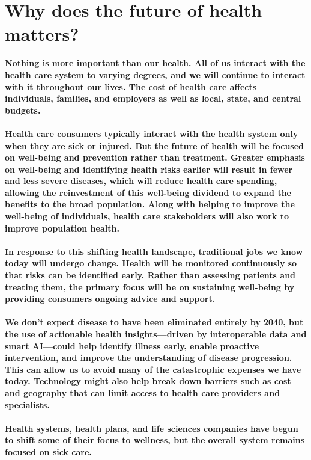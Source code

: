 \documentclass[12pt]{article}
\begin{document}
    \\\\\section{Why does the future of health matters?}
    \paragraph{Nothing is more important than our health. All of us interact with the health care system to varying degrees, and we will continue to interact with it throughout our lives. The cost of health care affects individuals, families, and employers as well as local, state, and central budgets.\\\\
   	Health care consumers typically interact with the health system only when they are sick or injured. But the future of health will be focused on well-being and prevention rather than treatment. Greater emphasis on well-being and identifying health risks earlier will result in fewer and less severe diseases, which will reduce health care spending, allowing the reinvestment of this well-being dividend to expand the benefits to the broad population. Along with helping to improve the well-being of individuals, health care stakeholders will also work to improve population health.\\\\
   	In response to this shifting health landscape, traditional jobs we know today will undergo change. Health will be monitored continuously so that risks can be identified early. Rather than assessing patients and treating them, the primary focus will be on sustaining well-being by providing consumers ongoing advice and support.\\\\
   	We don’t expect disease to have been eliminated entirely by 2040, but the use of actionable health insights—driven by interoperable data and smart AI—could help identify illness early, enable proactive intervention, and improve the understanding of disease progression. This can allow us to avoid many of the catastrophic expenses we have today. Technology might also help break down barriers such as cost and geography that can limit access to health care providers and specialists.\\\\
   	Health systems, health plans, and life sciences companies have begun to shift some of their focus to wellness, but the overall system remains focused on sick care.}
   \clearpage
\end{document}
